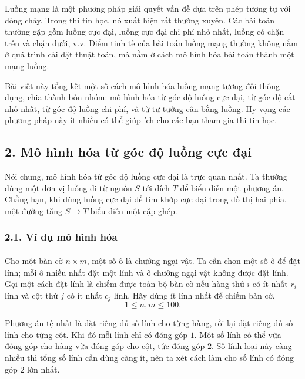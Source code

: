 \documentclass[11pt]{article}
\begin{document}
Luồng mạng là một phương pháp giải quyết vấn đề dựa trên phép tương tự với
dòng chảy. Trong thi tin học, nó xuất hiện rất thường xuyên. Các bài toán
thường gặp gồm luồng cực đại, luồng cực đại chi phí nhỏ nhất, luồng có chặn
trên và chặn dưới, v.v. Điểm tinh tế của bài toán luồng mạng thường không nằm
ở quá trình cài đặt thuật toán, mà nằm ở cách mô hình hóa bài toán thành một
mạng luồng.

Bài viết này tổng kết một số cách mô hình hóa luồng mạng tương đối thông
dụng, chia thành bốn nhóm: mô hình hóa từ góc độ luồng cực đại, từ góc độ cắt
nhỏ nhất, từ góc độ luồng chi phí, và từ tư tưởng cân bằng luồng. Hy vọng các
phương pháp này ít nhiều có thể giúp ích cho các bạn tham gia thi tin học.

\subsection*{2. Mô hình hóa từ góc độ luồng cực đại}

Nói chung, mô hình hóa từ góc độ luồng cực đại là trực quan nhất. Ta thường
dùng một đơn vị luồng đi từ nguồn \(S\) tới đích \(T\) để biểu diễn một phương
án. Chẳng hạn, khi dùng luồng cực đại để tìm khớp cực đại trong đồ thị hai
phía, một đường tăng \(S\to T\) biểu diễn một cặp ghép.

\subsubsection*{2.1. Ví dụ mô hình hóa}

\paragraph{}
Cho một bàn cờ \(n\times m\), một số ô là chướng ngại vật. Ta cần chọn một số
ô để đặt lính; mỗi ô nhiều nhất đặt một lính và ô chướng ngại vật không được
đặt lính. Gọi một cách đặt lính là chiếm được toàn bộ bàn cờ nếu hàng thứ
\(i\) có ít nhất \(r_i\) lính và cột thứ \(j\) có ít nhất \(c_j\) lính. Hãy
dùng ít lính nhất để chiếm bàn cờ.
\[
  1\le n,m\le 100.
\]

Phương án tệ nhất là đặt riêng đủ số lính cho từng hàng, rồi lại đặt riêng đủ
số lính cho từng cột. Khi đó mỗi lính chỉ có đóng góp \(1\). Một số lính có
thể vừa đóng góp cho hàng vừa đóng góp cho cột, tức đóng góp \(2\). Số lính
loại này càng nhiều thì tổng số lính cần dùng càng ít, nên ta xét cách làm
cho số lính có đóng góp \(2\) lớn nhất.
\end{document}
